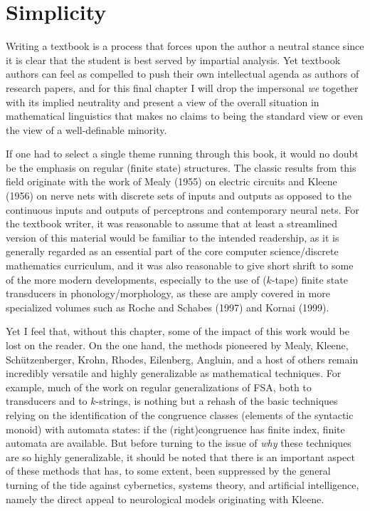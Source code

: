 \chapter{Simplicity}

Writing a textbook is a process that forces upon the author a neutral stance
since it is clear that the student is best served by impartial analysis. Yet
textbook authors can feel as compelled to push their own intellectual agenda
as authors of research papers, and for this final chapter I will drop the
impersonal {\it we} together with its implied neutrality and present a view
of the overall situation in mathematical linguistics that makes no claims to
being the standard view or even the view of a well-definable minority.  

If one had to select a single theme running through this book, it would no
doubt be the emphasis on regular (finite state) structures. The classic
results from this field originate with the work of Mealy
(1955)\nocite{Mealy:1955} on electric circuits and Kleene (1956) on nerve nets
with discrete sets of inputs and outputs as opposed to the continuous inputs
and outputs of perceptrons and contemporary neural nets. For the textbook
writer, it was reasonable to assume that at least a streamlined version of
this material would be familiar to the intended readership, as it is generally
regarded as an essential part of the core computer science/discrete
mathematics curriculum, and it was also reasonable to give short shrift to
some of the more modern developments, especially to the use of ($k$-tape)
finite state transducers in phonology/morphology, as these are amply covered
in more specialized volumes such as Roche and Schabes (1997) and Kornai
(1999).

Yet I feel that, without this chapter, some of the impact of this work would
be lost on the reader. On the one hand, the methods pioneered by Mealy,
Kleene, Sch\"{u}tzenberger, Krohn, Rhodes, Eilenberg, Angluin, and a host of
others remain incredibly versatile and highly generalizable as mathematical
techniques. For example, much of the work on regular generalizations of FSA,
both to transducers and to $k$-strings, is nothing but a rehash of the basic
techniques relying on the identification of the congruence classes (elements
of the syntactic monoid) with automata states: if the (right)congruence has
finite index, finite automata are available.  But before turning to the issue
of {\it why} these techniques are so highly generalizable, it should be noted
that there is an important aspect of these methods that has, to some extent,
been suppressed by the general turning of the tide against cybernetics,
systems theory, and artificial intelligence, namely the direct appeal to
neurological models originating with Kleene.


